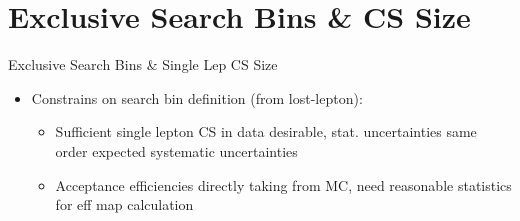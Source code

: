 \documentclass{beamer}
\begin{document}
\begin{frame}
\end{frame}



\section{Exclusive Search Bins \& CS Size}

\begin{frame}
 \begin{block}{}
 \centering
 \Large Exclusive Search Bins \& Single Lep CS Size
 \end{block}
\end{frame}


\begin{frame}
 \begin{itemize}
  \item Constrains on search bin definition (from lost-lepton):
  \begin{itemize}
   \item Sufficient single lepton CS in data desirable, stat. uncertainties same order expected systematic uncertainties
   \item Acceptance efficiencies directly taking from MC, need reasonable statistics for eff map calculation
  \end{itemize}
 \end{itemize}
  \begin{columns}
  \begin{column}{0.50\textwidth}
\end{column}
\end{columns}
\end{frame}
\end{document}
